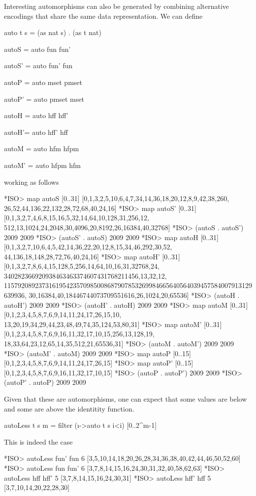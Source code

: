 \documentclass[]{INCLUDES/llncs}
\begin{document}
Interesting automorphisms can also be generated by combining alternative
encodings that share the same data representation. We can define
\begin{code}
auto t s = (as nat s) . (as t nat) 

autoS = auto fun fun'

autoS' = auto fun' fun

autoP = auto mset pmset

autoP' = auto pmset mset

autoH = auto hff hff'

autoH'= auto hff' hff

autoM = auto hfm hfpm

autoM' = auto hfpm hfm
\end{code}
working as follows
\begin{codex}
*ISO> map autoS [0..31]
[0,1,3,2,5,10,6,4,7,34,14,36,18,20,12,8,9,42,38,260,
 26,52,44,136,22,132,28,72,68,40,24,16]
*ISO> map autoS' [0..31]
[0,1,3,2,7,4,6,8,15,16,5,32,14,64,10,128,31,256,12,
 512,13,1024,24,2048,30,4096,20,8192,26,16384,40,32768] 
*ISO> (autoS . autoS') 2009
2009
*ISO> (autoS' . autoS) 2009
2009
*ISO> map autoH [0..31]
[0,1,3,2,7,10,6,4,5,42,14,36,22,20,12,8,15,34,46,292,30,52,
 44,136,18,148,28,72,76,40,24,16]
*ISO> map autoH' [0..31]
[0,1,3,2,7,8,6,4,15,128,5,256,14,64,10,16,31,32768,24,
 340282366920938463463374607431768211456,13,32,12,
 115792089237316195423570985008687907853269984665640564039457584007913129639936,
 30,16384,40,18446744073709551616,26,1024,20,65536]
 *ISO> (autoH . autoH') 2009
2009
*ISO> (autoH' . autoH) 2009
2009
*ISO> map autoM [0..31]
[0,1,2,3,4,5,8,7,6,9,14,11,24,17,26,15,10,
 13,20,19,34,29,44,23,48,49,74,35,124,53,80,31]
*ISO> map autoM' [0..31]
[0,1,2,3,4,5,8,7,6,9,16,11,32,17,10,15,256,13,128,19,
 18,33,64,23,12,65,14,35,512,21,65536,31]
 *ISO> (autoM . autoM') 2009
2009
*ISO> (autoM' . autoM) 2009
2009
*ISO> map autoP [0..15]
[0,1,2,3,4,5,8,7,6,9,14,11,24,17,26,15]
*ISO> map autoP' [0..15]
[0,1,2,3,4,5,8,7,6,9,16,11,32,17,10,15]
*ISO> (autoP . autoP') 2009
2009
*ISO> (autoP' . autoP) 2009
2009
\end{codex}
Given that these are automorphisms, one can expect that some values
are below and some are above the identitity function.
\begin{code}
autoLess t s m = filter (\i->auto t s i<i) [0..2^m-1] 
\end{code}
This is indeed the case
\begin{codex}
*ISO> autoLess fun' fun 6
[3,5,10,14,18,20,26,28,34,36,38,40,42,44,46,50,52,60]
*ISO> autoLess fun fun' 6
[3,7,8,14,15,16,24,30,31,32,40,58,62,63]
*ISO> autoLess hff hff' 5
[3,7,8,14,15,16,24,30,31]
*ISO> autoLess hff' hff 5
[3,7,10,14,20,22,28,30]
\end{codex}
\end{document}
